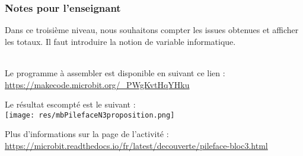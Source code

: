 \newpage
\subsubsection{Notes pour l'enseignant}

Dans ce troisième niveau, nous souhaitons compter les issues obtenues et afficher les totaux.
Il faut introduire la notion de variable informatique.


\\ Le programme à assembler est disponible en suivant ce lien :
~\\ \url{https://makecode.microbit.org/_PWgKvtHqYHku}



\begin{methode}
Le résultat escompté est le suivant :\\
\texttt{[image: res/mbPilefaceN3proposition.png]}
\end{methode}

\begin{remarque}
Plus d'informations sur la page de l'activité :\\ \url{https://microbit.readthedocs.io/fr/latest/decouverte/pileface-bloc3.html}
\end{remarque}


